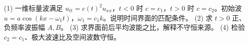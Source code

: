 (1) 一维标量波满足 \(u_{tt}=c(t)^2u_{xx}\)，\(t<0\) 时 \(c=c_1\)，\(t>0\) 时 \(c=c_2\)。初始波 \(u=a\cos(kx-\omega_1t)\)，\(\omega_1=c_1k\)。说明时间界面的匹配条件。
(2) 求 \(t>0\) 正、负频率波振幅 \(A,B\)。
(3) 求界面前后平均波能之比，解释不守恒来源。
(4) 检验 \(c_2=c_1\)、极大波速比及空间波数守恒。
